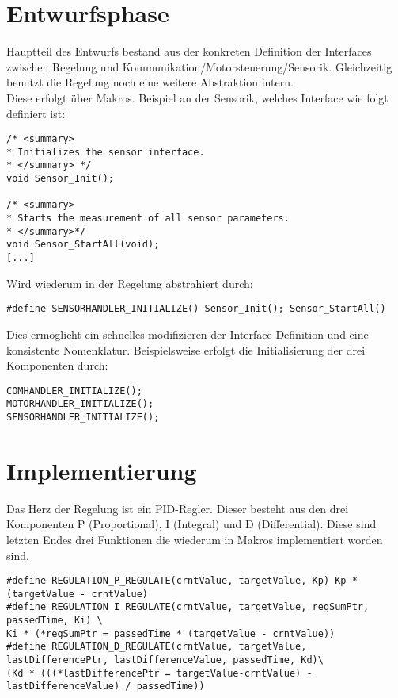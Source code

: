 \section{Entwurfsphase}
Hauptteil des Entwurfs bestand aus der konkreten Definition der Interfaces zwischen Regelung und Kommunikation/Motorsteuerung/Sensorik. Gleichzeitig benutzt die Regelung noch eine weitere Abstraktion intern.\\
Diese erfolgt über Makros. Beispiel an der Sensorik, welches Interface wie folgt definiert ist:
\begin{lstlisting}[frame=single, caption=Interne Abstrahierung des Sensorik Interface, label=lst:protoEx]
/* <summary>
* Initializes the sensor interface.
* </summary> */
void Sensor_Init();

/* <summary>
* Starts the measurement of all sensor parameters.
* </summary>*/
void Sensor_StartAll(void);
[...]
\end{lstlisting}

Wird wiederum in der Regelung abstrahiert durch:
\begin{lstlisting}[frame=single, caption=Interne Abstrahierung des Sensorik Interface, label=lst:protoEx]
#define SENSORHANDLER_INITIALIZE() Sensor_Init(); Sensor_StartAll()
\end{lstlisting}
Dies ermöglicht ein schnelles modifizieren der Interface Definition und eine konsistente Nomenklatur. Beispielsweise erfolgt die Initialisierung der drei Komponenten durch:
\begin{lstlisting}[frame=single, caption=Interne Abstrahierung des Sensorik Interface, label=lst:protoEx]
COMHANDLER_INITIALIZE();
MOTORHANDLER_INITIALIZE();
SENSORHANDLER_INITIALIZE();
\end{lstlisting}

\section{Implementierung}
Das Herz der Regelung ist ein PID-Regler. Dieser besteht aus den drei Komponenten P (Proportional), I (Integral) und D (Differential).\cite{regl} Diese sind letzten Endes drei Funktionen die wiederum in Makros implementiert worden sind.\\

\begin{lstlisting}[frame=single, caption=Interne Abstrahierung des Sensorik Interface, label=lst:protoEx]
#define REGULATION_P_REGULATE(crntValue, targetValue, Kp) Kp * (targetValue - crntValue)
#define REGULATION_I_REGULATE(crntValue, targetValue, regSumPtr, passedTime, Ki) \
Ki * (*regSumPtr = passedTime * (targetValue - crntValue))
#define REGULATION_D_REGULATE(crntValue, targetValue, lastDifferencePtr, lastDifferenceValue, passedTime, Kd)\
(Kd * (((*lastDifferencePtr = targetValue-crntValue) - lastDifferenceValue) / passedTime))
\end{lstlisting}

